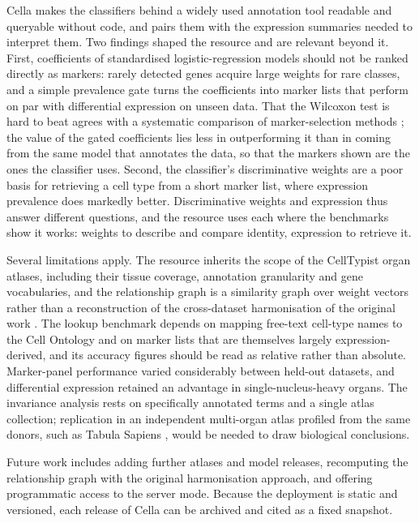 \documentclass[11pt]{article}
\newcommand{\cella}{Cella}
\begin{document}
\cella{} makes the classifiers behind a widely used annotation tool readable and queryable without code, and pairs them with the expression summaries needed to interpret them. Two findings shaped the resource and are relevant beyond it. First, coefficients of standardised logistic-regression models should not be ranked directly as markers: rarely detected genes acquire large weights for rare classes, and a simple prevalence gate turns the coefficients into marker lists that perform on par with differential expression on unseen data. That the Wilcoxon test is hard to beat agrees with a systematic comparison of marker-selection methods \cite{pullin2024}; the value of the gated coefficients lies less in outperforming it than in coming from the same model that annotates the data, so that the markers shown are the ones the classifier uses. Second, the classifier's discriminative weights are a poor basis for retrieving a cell type from a short marker list, where expression prevalence does markedly better. Discriminative weights and expression thus answer different questions, and the resource uses each where the benchmarks show it works: weights to describe and compare identity, expression to retrieve it.

Several limitations apply. The resource inherits the scope of the CellTypist organ atlases, including their tissue coverage, annotation granularity and gene vocabularies, and the relationship graph is a similarity graph over weight vectors rather than a reconstruction of the cross-dataset harmonisation of the original work \cite{xu2023}. The lookup benchmark depends on mapping free-text cell-type names to the Cell Ontology and on marker lists that are themselves largely expression-derived, and its accuracy figures should be read as relative rather than absolute. Marker-panel performance varied considerably between held-out datasets, and differential expression retained an advantage in single-nucleus-heavy organs. The invariance analysis rests on \invTierOne{} specifically annotated terms and a single atlas collection; replication in an independent multi-organ atlas profiled from the same donors, such as Tabula Sapiens \cite{tabulasapiens2022}, would be needed to draw biological conclusions.

Future work includes adding further atlases and model releases, recomputing the relationship graph with the original harmonisation approach, and offering programmatic access to the server mode. Because the deployment is static and versioned, each release of \cella{} can be archived and cited as a fixed snapshot.
\end{document}
